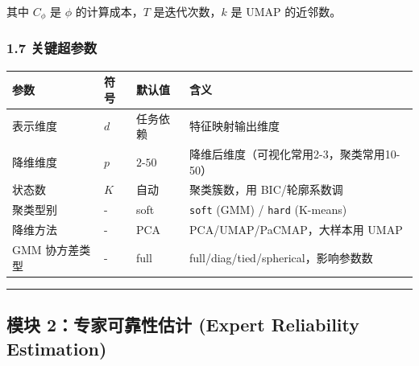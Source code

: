 \documentclass[
  12pt,
]{ctexart}
\begin{document}
其中 \(C_\phi\) 是 \(\phi\) 的计算成本，\(T\) 是迭代次数，\(k\) 是 UMAP
的近邻数。

\subsubsection{1.7 关键超参数}\label{ux5173ux952eux8d85ux53c2ux6570}

\begin{longtable}[]{@{}
  >{\raggedright\arraybackslash}p{}
  >{\raggedright\arraybackslash}p{}
  >{\raggedright\arraybackslash}p{}
  >{\raggedright\arraybackslash}p{}@{}}
\toprule\noalign{}
\begin{minipage}[b]{\linewidth}\raggedright
参数
\end{minipage} & \begin{minipage}[b]{\linewidth}\raggedright
符号
\end{minipage} & \begin{minipage}[b]{\linewidth}\raggedright
默认值
\end{minipage} & \begin{minipage}[b]{\linewidth}\raggedright
含义
\end{minipage} \\
\midrule\noalign{}
\endhead
\bottomrule\noalign{}
\endlastfoot
表示维度 & \(d\) & 任务依赖 & 特征映射输出维度 \\
降维维度 & \(p\) & \(2\)-\(50\) &
降维后维度（可视化常用2-3，聚类常用10-50） \\
状态数 & \(K\) & 自动 & 聚类簇数，用 BIC/轮廓系数调 \\
聚类型别 & - & soft & \texttt{soft} (GMM) / \texttt{hard} (K-means) \\
降维方法 & - & PCA & PCA/UMAP/PaCMAP，大样本用 UMAP \\
GMM 协方差类型 & - & full & full/diag/tied/spherical，影响参数数 \\
\end{longtable}

\begin{center}\rule{0.5\linewidth}{0.5pt}\end{center}

\subsection{模块 2：专家可靠性估计 (Expert Reliability
Estimation)}\label{ux6a21ux5757-2ux4e13ux5bb6ux53efux9760ux6027ux4f30ux8ba1-expert-reliability-estimation}
\end{document}
